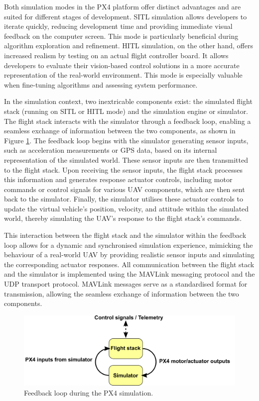 Both simulation modes in the PX4 platform offer distinct advantages and are suited for different stages of development. SITL simulation allows developers to iterate quickly, reducing development time and providing immediate visual feedback on the computer screen. This mode is particularly beneficial during algorithm exploration and refinement. HITL simulation, on the other hand, offers increased realism by testing on an actual flight controller board. It allows developers to evaluate their vision-based control solutions in a more accurate representation of the real-world environment. This mode is especially valuable when fine-tuning algorithms and assessing system performance.

In the simulation context, two inextricable components exist: the simulated flight stack (running on SITL or HITL mode) and the simulation engine or simulator. The flight stack interacts with the simulator through a feedback loop, enabling a seamless exchange of information between the two components, as shown in Figure \ref{fig:simulator-loop}.
The feedback loop begins with the simulator generating sensor inputs, such as acceleration measurements or GPS data, based on its internal representation of the simulated world. These sensor inputs are then transmitted to the flight stack.
Upon receiving the sensor inputs, the flight stack processes this information and generates response actuator controls, including motor commands or control signals for various UAV components, which are then sent back to the simulator. Finally, the simulator utilises these actuator controls to update the virtual vehicle's position, velocity, and attitude within the simulated world, thereby simulating the UAV's response to the flight stack's commands. 

This interaction between the flight stack and the simulator within the feedback loop allows for a dynamic and synchronised simulation experience, mimicking the behaviour of a real-world UAV by providing realistic sensor inputs and simulating the corresponding actuator responses.
All communication between the flight stack and the simulator is implemented using the MAVLink messaging protocol and the UDP transport protocol. MAVLink messages serve as a standardised format for transmission, allowing the seamless exchange of information between the two components.

\begin{figure}
  \centering
  \includegraphics[width=\textwidth,keepaspectratio]{img/px4-simulator-loop.png}
  \caption{Feedback loop during the PX4 simulation.}
  \label{fig:simulator-loop}
\end{figure}

